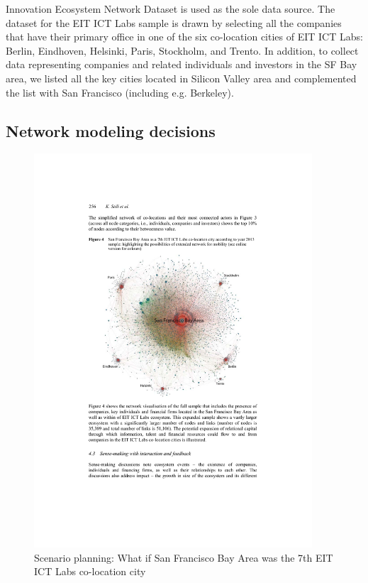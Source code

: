 Innovation Ecosystem Network Dataset \citep{Rubens2010LeveragingMoves} is used as the sole data source. The dataset for the EIT ICT Labs sample is drawn by selecting all the companies that have their primary office in one of the six co-location cities of EIT ICT Labs: Berlin, Eindhoven, Helsinki, Paris, Stockholm, and Trento. In addition, to collect data representing companies and related individuals and investors in the SF Bay area, we listed all the key cities located in Silicon Valley area and complemented the list with San Francisco (including e.g. Berkeley).

\subsection{Network modeling decisions}

\begin{figure}[htb]
\centering
\includegraphics[width=0.925\textwidth]{figure/EIT-ICT-Labs-What-if-SF-Bay.pdf}
\caption{Scenario planning: What if San Francisco Bay Area was the 7th EIT ICT Labs co-location city \citep{Still2014InsightsVisualisations}}
\label{fig:eit-ict-labs-SF-Bay}
\end{figure}

